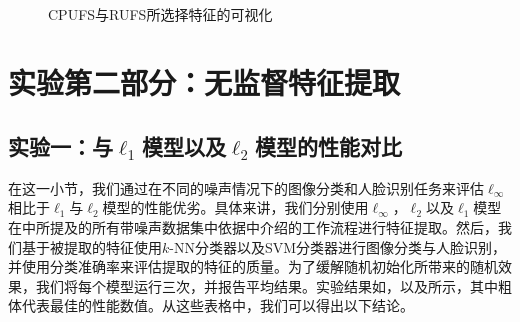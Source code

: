 \begin{figure}[!ht]
    \hspace{0.01\linewidth}
    \hspace{0.01\linewidth}
    \\
    \caption{CPUFS与RUFS所选择特征的可视化}
    \label{fig:visulization}
\end{figure}
\clearpage
\section{实验第二部分：无监督特征提取}
\subsection{实验一：与\texorpdfstring{$\ell_{1}$}{L1}模型以及\texorpdfstring{$\ell_{2}$}{L2}模型的性能对比}
在这一小节，我们通过在不同的噪声情况下的图像分类和人脸识别任务来评估$\ell_{\infty}$相比于$\ell_{1}$与$\ell_{2}$模型的性能优劣。具体来讲，我们分别使用$\ell_{\infty}$，$\ell_{2}$以及$\ell_{1}$模型在中所提及的所有带噪声数据集中依据中介绍的工作流程进行特征提取。然后，我们基于被提取的特征使用$k$-NN分类器以及SVM分类器进行图像分类与人脸识别，并使用分类准确率来评估提取的特征的质量。为了缓解随机初始化所带来的随机效果，我们将每个模型运行三次，并报告平均结果。实验结果如，以及所示，其中粗体代表最佳的性能数值。从这些表格中，我们可以得出以下结论。

